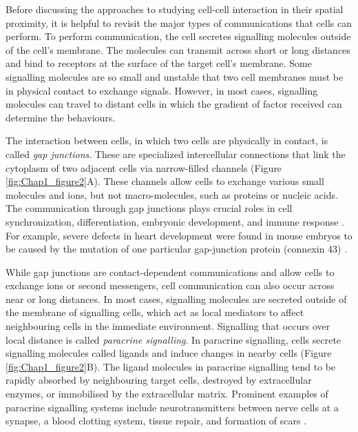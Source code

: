 Before discussing the approaches to studying cell-cell interaction in their spatial proximity, it is helpful to revisit the major types of communications that cells can perform. To perform communication, the cell secretes signalling molecules outside of the cell's membrane. The molecules can transmit across short or long distances and bind to receptors at the surface of the target cell's membrane. Some signalling molecules are so small and unstable that two cell membranes must be in physical contact to exchange signals. However, in most cases, signalling molecules can travel to distant cells in which the gradient of factor received can determine the behaviours.         

The interaction between cells, in which two cells are physically in contact, is called \textit{gap junctions}. These are specialized intercellular connections that link the cytoplasm of two adjacent cells via narrow-filled channels (Figure \ref{fig:Chap1_figure2}A). These channels allow cells to exchange various small molecules and ions, but not macro-molecules, such as proteins or nucleic acids. The communication through gap junctions plays crucial roles in cell synchronization, differentiation, embryonic development, and immune response \cite{white1999genetic, vinken2006connexins}. For example, severe defects in heart development were found in mouse embryos to be caused by the mutation of one particular gap-junction protein (connexin 43) \cite{alberts2018molecular}.

While gap junctions are contact-dependent communications and allow cells to exchange ions or second messengers, cell communication can also occur across near or long distances. In most cases, signalling molecules are secreted outside of the membrane of signalling cells, which act as local mediators to affect neighbouring cells in the immediate environment. Signalling that occurs over local distance is called \textit{paracrine signalling}. In paracrine signalling, cells secrete signalling molecules called ligands and induce changes in nearby cells (Figure \ref{fig:Chap1_figure2}B). The ligand molecules in paracrine signalling tend to be rapidly absorbed by neighbouring target cells, destroyed by extracellular enzymes, or immobilised by the extracellular matrix. Prominent examples of paracrine signalling systems include neurotransmitters between nerve cells at a synapse, a blood clotting system, tissue repair, and formation of scars
\cite{huang1998gap}. 

